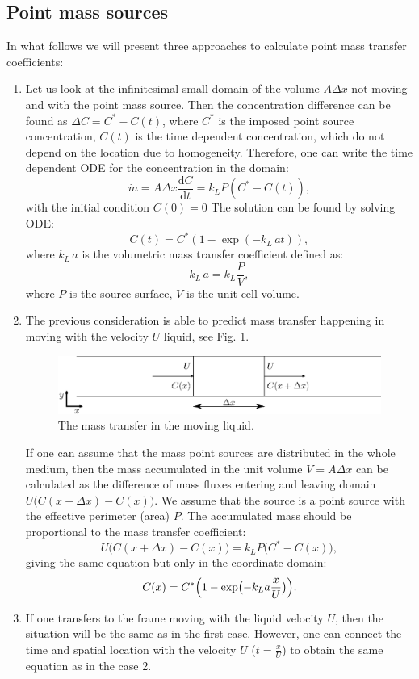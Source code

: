 \documentclass{article}
\newcommand{\beq}{\begin{equation}}
\newcommand{\feq}{\end{equation}}
\newcommand{\vol}{k_L\,a}
\newcommand{\cstar}{C^{*}}
\begin{document}
\subsection{Point mass sources}
In what follows we will present three approaches to calculate point mass transfer
coefficients:
\begin{enumerate}
\item
Let us look at the infinitesimal small domain of the volume $A \Delta x$ not
moving and with the point mass source.  Then the concentration difference can be found as $\Delta C =
\cstar -
C(t)$, where $\cstar$ is the imposed point source concentration, $C(t)$ is
the time dependent concentration, which do not depend on the location due to homogeneity. Therefore, one can write the time dependent ODE for the
concentration in the domain:
\beq
\dot{m}= A \Delta x \frac{\mathrm{d}C}{\mathrm{d} t} = k_L P (\cstar-C(t)), 
\feq
with the initial condition $C(0)=0$
The solution can be found by solving ODE:
\beq
C(t)= \cstar (1-\exp(-\vol t )), 
\feq
where $\vol$ is the volumetric mass transfer coefficient defined as:
\beq
\vol=k_L \frac{P}{V},
\feq
where $P$ is the source surface, $V$ is the unit cell volume.
\item
The previous consideration is able to predict mass transfer happening in moving with the velocity
$U$ liquid, see Fig. \ref{fig:moving:frame}. 
\begin{figure}[htb!]
\includegraphics[width=\textwidth]{Figures/mass_transfer.eps}
\caption{The mass transfer in the moving liquid. \label{fig:moving:frame}}
\end{figure}

If one can assume that the mass point sources are distributed in the whole medium, then the mass accumulated in the unit volume $V=A \Delta x$ can be calculated as the difference of 
mass fluxes entering and leaving domain $U \bigl(C(x+\Delta x)-C(x)\bigr)$. We assume that the
source is a point source with the effective perimeter (area) $P$. The accumulated mass should be proportional
to the mass transfer coefficient:
\beq
U \bigl(C(x+\Delta x)-C(x)\bigr)=k_L P \bigl(\cstar-C(x)\bigr), 
\feq 
giving the same equation but only in the coordinate domain:
\beq
C(x)= \cstar \Bigl(1-\exp\bigl(-k_L a \frac{x}{U} \bigr)\Bigr).
\label{main:mass:transfer:expression} 
\feq

\item If one transfers to the frame moving with the liquid velocity $U$, then the situation will be
the same as in the first case. However, one can connect the time and spatial location with the
velocity $U$ ($t=\frac{x}{U}$) to obtain the same equation as in the case 2.
\end{enumerate}
\end{document}
